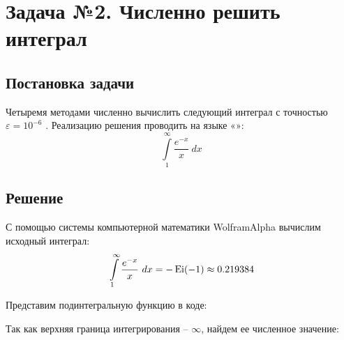\def \task {
	\int\limits_1^{\infty} {\frac{ e^{-x} }{ x } ~ dx}
}

\newcommand{\accuracy}{
	$\varepsilon = 10^{-6} $
}

\section{Задача №2. Численно решить интеграл}
	\subsection{Постановка задачи}
		Четыремя методами численно вычислить следующий интеграл с 
		точностью \accuracy. 
		Реализацию решения проводить на языке «\Csh»:
			\[ \task \]

	\subsection{Решение}
	
		С помощью системы компьютерной математики WolframAlpha вычислим исходный интеграл:
		\[ \task = -\Ei{-1} \approx 0.219384 \]
		
		Представим подинтегральную функцию в коде:
		
		
		
		Так как верхняя граница интегрирования -- $ \infty $, найдем ее
		численное значение:
		
		
		
		\begin{enumerate}
			
			
			
			\newpage
			
		\end{enumerate}
